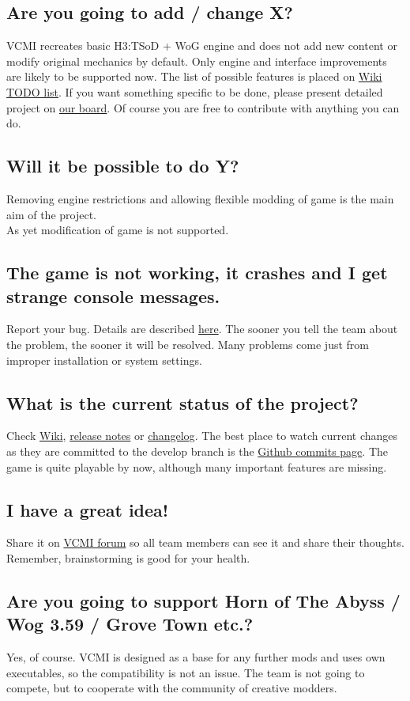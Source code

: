 \documentclass[a4size,final]{article}
\begin{document}
\subsection{Are you going to add / change X?}
VCMI recreates basic H3:TSoD + WoG engine and does not add new content or modify original mechanics by default. Only engine and interface improvements are likely to be supported now. The list of possible features is placed on \href{http://wiki.vcmi.eu/index.php?title=TODO_list}{Wiki TODO list}.
If you want something specific to be done, please present detailed project on \href{http://forum.vcmi.eu/index.php}{our board}. Of course you are free to contribute with anything you can do.
\subsection{Will it be possible to do Y?}
Removing engine restrictions and allowing flexible modding of game is the main aim of the project.\\
As yet modification of game is not supported.
\subsection{The game is not working, it crashes and I get strange console messages.}
Report your bug. Details are described \hyperref[Feedback]{here}. The sooner you tell the team about the problem, the sooner it will be resolved. Many problems come just from improper installation or system settings.
\subsection{What is the current status of the project?}
Check \href{http://wiki.vcmi.eu/index.php?title=VCMI}{Wiki}, \href{http://forum.vcmi.eu/viewforum.php?f=1}{release notes} or \href{https://github.com/vcmi/vcmi/blob/develop/ChangeLog}{changelog}. The best place to watch current changes as they are committed to the develop branch is the \href{https://github.com/vcmi/vcmi/commits/develop}{Github commits page}. The game is quite playable by now, although many important features are missing.
\subsection{I have a great idea!}
Share it on \href{http://forum.vcmi.eu/index.php}{VCMI forum} so all team members can see it and share their thoughts. Remember, brainstorming is good for your health.
\subsection{Are you going to support Horn of The Abyss / Wog 3.59 / Grove Town etc.?}
Yes, of course. VCMI is designed as a base for any further mods and uses own executables, so the compatibility is not an issue. The team is not going to compete, but to cooperate with the community of creative modders.
\end{document}

